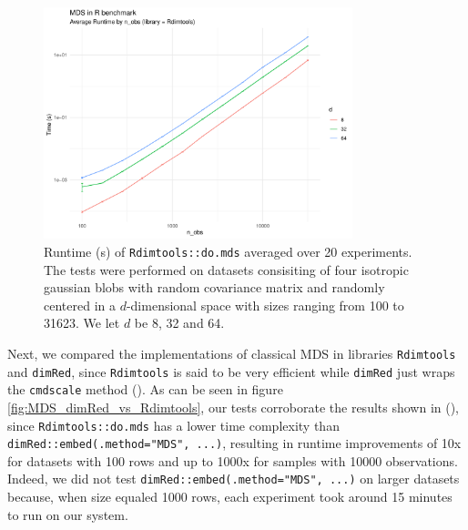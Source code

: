 \documentclass[a4paper,12pt]{article}
\begin{document}
\begin{figure}[ht]
    \centering
    \includegraphics[width=0.8\textwidth]{figures/MDS_Rdimtools.pdf}
    \caption{Runtime (s) of \texttt{Rdimtools::do.mds} averaged over 20 experiments. The tests were performed on datasets consisiting of four isotropic gaussian blobs with random covariance matrix and randomly centered in a $d$-dimensional space with sizes ranging from 100 to 31623. We let $d$ be 8, 32 and 64.}
    \label{fig:MDS_Rdimtools}
\end{figure}

Next, we compared the implementations of classical MDS in libraries \texttt{Rdimtools} and \texttt{dimRed}, since \texttt{Rdimtools} is said to be very efficient while \texttt{dimRed} just wraps the \texttt{cmdscale} method (\cite{Kraemer2018}). As can be seen in figure \ref{fig:MDS_dimRed_vs_Rdimtools}, our tests corroborate the results shown in (\cite{You2022}), since \texttt{Rdimtools::do.mds} has a lower time complexity than \texttt{dimRed::embed(.method="MDS", ...)}, resulting in runtime improvements of 10x for datasets with 100 rows and up to 1000x for samples with 10000 observations. Indeed, we did not test \texttt{dimRed::embed(.method="MDS", ...)} on larger datasets because, when size equaled 1000 rows, each experiment took around 15 minutes to run on our system.
\end{document}
